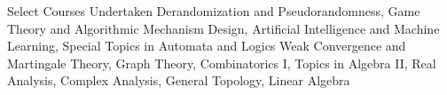 \begin{rubric}{Select Courses Undertaken}
		Derandomization and Pseudorandomness, Game Theory and Algorithmic Mechanism Design, Artificial Intelligence and Machine Learning, Special Topics in Automata and Logics%
	\entry*[Mathematics]
		Weak Convergence and Martingale Theory, Graph Theory, Combinatorics I, Topics in Algebra II, Real Analysis, Complex Analysis, General Topology, Linear Algebra
\end{rubric}